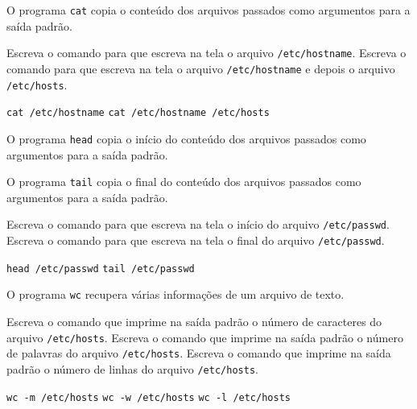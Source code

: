 \begin{Exercise}[label={0014}, difficulty={0}, origin={coreutils}]
  O programa \lstinline+cat+ copia o conteúdo dos arquivos passados como
  argumentos para a saída padrão.

  \Question Escreva o comando para que escreva na tela o arquivo
  \lstinline+/etc/hostname+.
  \Question Escreva o comando para que escreva na tela o arquivo
  \lstinline+/etc/hostname+ e depois o arquivo \lstinline+/etc/hosts+.
\end{Exercise}
\begin{Answer}[ref={0014}]
  \Question \lstinline+cat /etc/hostname+
  \Question \lstinline+cat /etc/hostname /etc/hosts+
\end{Answer}

\begin{Exercise}[label={0015}, difficulty={0}, origin={coreutils}]
  O programa \lstinline+head+ copia o início do conteúdo dos arquivos passados
  como argumentos para a saída padrão.

  O programa \lstinline+tail+ copia o final do conteúdo dos arquivos passados
  como argumentos para a saída padrão.

  \Question Escreva o comando para que escreva na tela o início do arquivo
  \lstinline+/etc/passwd+.
  \Question Escreva o comando para que escreva na tela o final do arquivo
  \lstinline+/etc/passwd+.
\end{Exercise}
\begin{Answer}[ref={0015}]
  \Question \lstinline+head /etc/passwd+
  \Question \lstinline+tail /etc/passwd+
\end{Answer}

\begin{Exercise}[label={0016}, difficulty={0}, origin={coreutils}]
  O programa \lstinline+wc+ recupera várias informações de um arquivo de texto.

  \Question Escreva o comando que imprime na saída padrão o número de
  caracteres do arquivo \lstinline+/etc/hosts+.
  \Question Escreva o comando que imprime na saída padrão o número de palavras
  do arquivo \lstinline+/etc/hosts+.
  \Question Escreva o comando que imprime na saída padrão o número de linhas
  do arquivo \lstinline+/etc/hosts+.
\end{Exercise}
\begin{Answer}[ref={0016}]
  \Question \lstinline+wc -m /etc/hosts+
  \Question \lstinline+wc -w /etc/hosts+
  \Question \lstinline+wc -l /etc/hosts+
\end{Answer}

